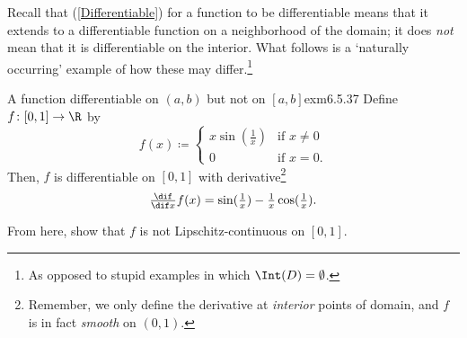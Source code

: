 Recall that (\cref{Differentiable}) for a function to be differentiable means that it extends to a differentiable function on a neighborhood of the domain; it does \emph{not} mean that it is differentiable on the interior.  What follows is a `naturally occurring' example of how these may differ.\footnote{As opposed to stupid examples in which $\Int (D)=\emptyset$.}
\begin{exm}{A function differentiable on $(a,b)$ but not on $[a,b]$}{exm6.5.37}
Define $f\colon [0,1]\rightarrow \R$ by
\begin{equation}
f(x)\coloneqq \begin{cases}x\sin (\tfrac{1}{x}) & \text{if }x\neq 0 \\ 0 & \text{if }x=0.\end{cases}
\end{equation}
Then, $f$ is differentiable on $[0,1]$ with derivative\footnote{Remember, we only define the derivative at \emph{interior} points of domain, and $f$ is in fact \emph{smooth} on $(0,1)$.}
\begin{equation}
\tfrac{\dif}{\dif x}f(x)=\sin (\tfrac{1}{x})-\tfrac{1}{x}\cos (\tfrac{1}{x}).
\end{equation}
\begin{exr}[breakable=false]{}{}
From here, show that $f$ is not Lipschitz-continuous on $[0,1]$.
\end{exr}
\end{exm}


